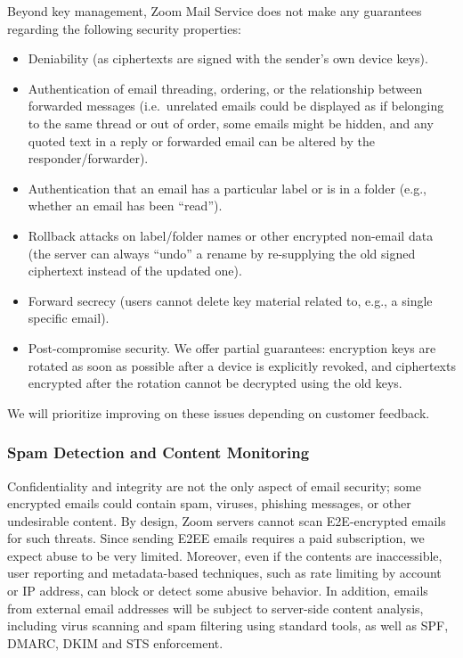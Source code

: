 Beyond key management, Zoom Mail Service does not make any guarantees regarding the following
security properties:
\begin{itemize}
    \item Deniability (as ciphertexts are signed with the sender's own device keys).
    \item Authentication of email threading, ordering, or the relationship between forwarded
        messages (i.e.\ unrelated emails could be displayed as if belonging to the same thread or out
        of order, some emails might be hidden, and any quoted text in a reply or forwarded email can
        be altered by the responder/forwarder).
    \item Authentication that an email has a particular label or is in a folder (e.g., whether an
        email has been ``read'').
    \item Rollback attacks on label/folder names or other encrypted non-email data (the server can
        always ``undo'' a rename by re-supplying the old signed ciphertext instead of the updated
        one).
    \item Forward secrecy (users cannot delete key material related to, e.g., a single specific
        email).
    \item Post-compromise security. We offer partial guarantees: encryption keys are rotated as soon
        as possible after a device is explicitly revoked, and ciphertexts encrypted after the
        rotation cannot be decrypted using the old keys. 
\end{itemize}

We will prioritize improving on these issues depending on customer feedback.

\subsubsection{Spam Detection and Content Monitoring}

Confidentiality and integrity are not the only aspect of email security; some encrypted emails could
contain spam, viruses, phishing messages, or other undesirable content. By design, Zoom servers
cannot scan E2E-encrypted emails for such threats. Since sending E2EE emails requires a paid
subscription, we expect abuse to be very limited. Moreover, even if the contents are inaccessible,
user reporting and metadata-based techniques, such as rate limiting by account or IP address, can
block or detect some abusive behavior. In addition, emails from external email addresses will be
subject to server-side content analysis, including virus scanning and spam filtering using standard
tools, as well as SPF, DMARC, DKIM and STS enforcement.
